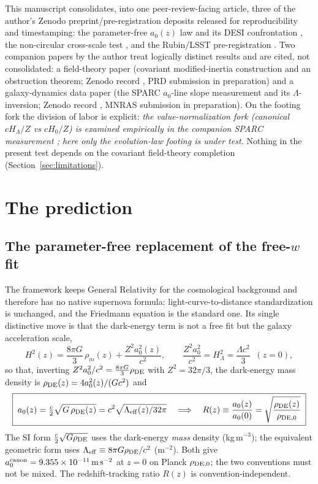 \documentclass[11pt,a4paper]{article}
\newcommand{\rhoDE}{\rho_{\rm DE}}
\newcommand{\azero}{a_0}
\newcommand{\msms}{{\rm m\,s^{-2}}}
\begin{document}
This manuscript consolidates, into one peer-review-facing article, three of
the author's Zenodo preprint/pre-registration deposits released for
reproducibility and timestamping: the parameter-free $\azero(z)$ law and its
DESI confrontation \cite{Zdesi}, the non-circular cross-scale test
\cite{Zcross}, and the Rubin/LSST pre-registration \cite{Zprereg}. Two
companion papers by the author treat logically distinct results and are cited,
not consolidated: a field-theory paper (covariant modified-inertia
construction and an obstruction theorem; Zenodo record \cite{Zmift}, PRD
submission in preparation) and a galaxy-dynamics data paper (the SPARC
$\azero$-line slope measurement and its $\Lambda$-inversion; Zenodo record
\cite{Za0line}, MNRAS submission in preparation). On the footing fork the
division of labor is explicit: \emph{the value-normalization fork (canonical
$cH_\Lambda/Z$ vs $cH_0/Z$) is examined empirically in the companion SPARC
measurement \cite{Za0line}; here only the evolution-law footing is under
test.} Nothing in the present test depends on the covariant field-theory
completion (Section~\ref{sec:limitations}).

\section{The prediction}
\label{sec:prediction}

\subsection{The parameter-free replacement of the free-$w$ fit}

The framework keeps General Relativity for the cosmological background and
therefore has no native supernova formula: light-curve-to-distance
standardization is unchanged, and the Friedmann equation is the standard one.
Its single distinctive move is that the dark-energy term is not a free fit but
the galaxy acceleration scale,
\begin{equation}
H^2(z)=\frac{8\pi G}{3}\,\rho_m(z)+\frac{Z^2\azero^2(z)}{c^2},
\qquad \frac{Z^2\azero^2}{c^2}=H_\Lambda^2=\frac{\Lambda c^2}{3}\;\;(z=0),
\end{equation}
so that, inverting $Z^2\azero^2/c^2=\tfrac{8\pi G}{3}\rhoDE$ with
$Z^2=32\pi/3$, the dark-energy mass density is
$\rhoDE(z)=4\azero^2(z)/(Gc^2)$ and
\begin{equation}
\boxed{\;\azero(z)=\tfrac{c}{2}\sqrt{G\,\rhoDE(z)}
=c^2\sqrt{\Lambda_{\rm eff}(z)/32\pi}
\quad\Longrightarrow\quad
R(z)\equiv\frac{\azero(z)}{\azero(0)}=\sqrt{\frac{\rhoDE(z)}{\rho_{\rm DE,0}}}\;}
\label{eq:law}
\end{equation}
The SI form $\tfrac{c}{2}\sqrt{G\rhoDE}$ uses the dark-energy \emph{mass}
density (kg\,m$^{-3}$); the equivalent geometric form uses
$\Lambda_{\rm eff}\equiv8\pi G\rhoDE/c^2$ (m$^{-2}$). Both give
$\azero^{\rm canon}=9.355\times10^{-11}\,\msms$ at $z=0$ on Planck
$\rho_{\rm DE,0}$; the two conventions must not be mixed. The
redshift-tracking ratio $R(z)$ is convention-independent.
\end{document}
